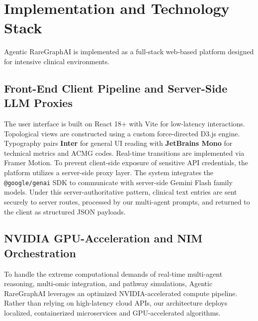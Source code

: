 \documentclass[conference]{IEEEtran}
\begin{document}
\section{Implementation and Technology Stack}
Agentic RareGraphAI is implemented as a full-stack web-based platform designed for intensive clinical environments.

\subsection{Front-End Client Pipeline and Server-Side LLM Proxies}
The user interface is built on React 18+ with Vite for low-latency interactions. Topological views are constructed using a custom force-directed D3.js engine. Typography pairs \textbf{Inter} for general UI reading with \textbf{JetBrains Mono} for technical metrics and ACMG codes. Real-time transitions are implemented via Framer Motion. To prevent client-side exposure of sensitive API credentials, the platform utilizes a server-side proxy layer. The system integrates the \texttt{@google/genai} SDK to communicate with server-side Gemini Flash family models. Under this server-authoritative pattern, clinical text entries are sent securely to server routes, processed by our multi-agent prompts, and returned to the client as structured JSON payloads.

\subsection{NVIDIA GPU-Acceleration and NIM Orchestration}
To handle the extreme computational demands of real-time multi-agent reasoning, multi-omic integration, and pathway simulations, Agentic RareGraphAI leverages an optimized NVIDIA-accelerated compute pipeline. Rather than relying on high-latency cloud APIs, our architecture deploys localized, containerized microservices and GPU-accelerated algorithms.
\end{document}
